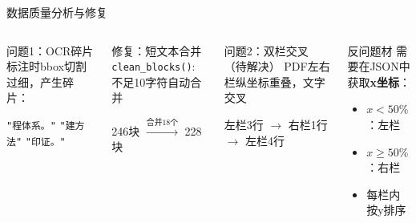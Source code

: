 \documentclass[aspectratio=169,11pt]{beamer}
\begin{document}
\begin{frame}{数据质量分析与修复}
\begin{columns}[T]
\begin{alertblock}{问题1：OCR碎片}
标注时bbox切割过细，产生碎片：

\smallskip
{\small
\texttt{"程体系。"} \texttt{"建方法"} \texttt{"印证。"}
}
\end{alertblock}

\begin{exampleblock}{修复：短文本合并}
\texttt{clean\_blocks()}: 不足10字符自动合并

\smallskip
\centering
246块 $\xrightarrow{\text{合并18个}}$ 228块 \quad {\color{goodgreen}\faCheckCircle}
\end{exampleblock}

\begin{alertblock}{问题2：双栏交叉（待解决）}
PDF左右栏纵坐标重叠，文字交叉

\smallskip
{\small 左栏3行 $\to$ 右栏1行 $\to$ 左栏4行}
\end{alertblock}

\begin{block}{反问题材}
需要在JSON中获取\textbf{x坐标}：
\begin{itemize}\small
  \item $x < 50\%$：左栏
  \item $x \geq 50\%$：右栏
  \item 每栏内按y排序
\end{itemize}
\end{block}
\end{columns}
\end{frame}
\end{document}
